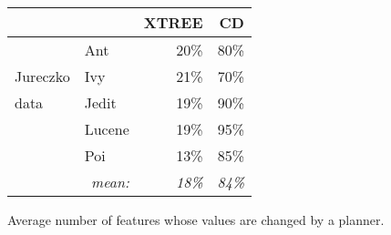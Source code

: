 \begin{figure}[!b]
\centering
{\small
\begin{tabular}{l|lrr}
  \hline
  \rowcolor{lightgray}
 &       & XTREE & CD   \\\hline
&Ant    & 20\%  & 80\%  \\
Jureczko&Ivy    & 21\% & 70\% \\
data&Jedit  & 19\% & 90\%  \\
&Lucene & 19\% & 95\%  \\
&Poi    & 13\% & 85\% \\\hline
\multicolumn{2}{r}{{\em mean:}}& {\em 18\%} & {\em 84\%}\\
\end{tabular}}
\noindent
\caption{Average number of features whose values are changed by a planner.}\label{fig:types}
\end{figure}